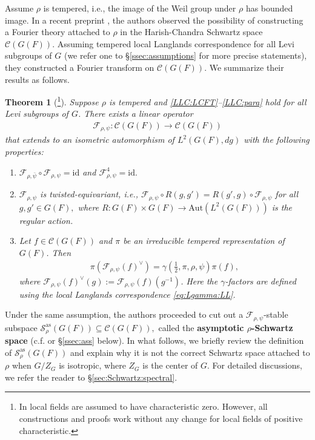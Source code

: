 \documentclass[10pt]{amsart}
\newtheorem{theorem}{Theorem}[section]
\theoremstyle{definition}
\numberwithin{equation}{section}
\numberwithin{equation}{subsection}
\begin{document}
Assume $\rho$ is tempered, i.e., the image of the Weil group under $\rho$ has bounded image. In a recent preprint \cite{DRS}, the authors observed the possibility of constructing a Fourier theory attached to $\rho$ in the Harish-Chandra Schwartz space $\mathcal{C}(G(F))$. Assuming tempered local Langlands correspondence for all Levi subgroups of $G$ (we refer one to \S\ref{ssec:assumptions} for more precise statements), they constructed a Fourier transform on $\mathcal{C}(G(F)).$ We summarize their results as follows.
\begin{theorem}[{\cite{DRS}}\footnote{ In \cite{DRS} local fields are assumed to have characteristic zero. However, all constructions and proofs work without any change for local fields of positive characteristic. }]
    Suppose $\rho$ is tempered and \eqref{LLC:LCFT}--\eqref{LLC:para} hold for all Levi subgroups of $G$. There exists a linear operator 
    \begin{align*}
        \mathcal{F}_{\rho,\psi}:\mathcal{C}(G(F))\to \mathcal{C}(G(F))
    \end{align*}
    that extends to an isometric automorphism of $L^2(G(F),dg)$ with the following properties:
    \begin{enumerate}
        \item $\mathcal{F}_{\rho,\bar{\psi}}\circ \mathcal{F}_{\rho,\psi}=\mathrm{id}$ and $\mathcal{F}_{\rho,\psi}^4=\mathrm{id}.$
        \item $\mathcal{F}_{\rho,\psi}$ is twisted-equivariant, i.e., $\mathcal{F}_{\rho,\psi}\circ R(g,g') = R(g',g)\circ \mathcal{F}_{\rho,\psi}$ for all $g,g'\in G(F),$ where $R:G(F)\times G(F)\longrightarrow\mathrm{Aut}(L^2(G(F)))$ is the regular action.
        \item Let $f\in \mathcal{C}(G(F))$ and $\pi$ be an irreducible tempered representation of $G(F)$. Then
        \begin{align*}
            \pi(\mathcal{F}_{\rho,\psi}(f)^\lor)=\gamma(\tfrac{1}{2},\pi,\rho,\psi)\pi(f),
        \end{align*}
        where $\mathcal{F}_{\rho,\psi}(f)^\lor(g):=\mathcal{F}_{\rho,\psi}(f)(g^{-1})$. Here the $\gamma$-factors are defined using the local Langlands correspondence \eqref{eq:Lgamma:LL}.
    \end{enumerate}
\end{theorem}

Under the same assumption, the authors proceeded to cut out a $\mathcal{F}_{\rho,\psi}$-stable subspace $\mathcal{S}^{\mathrm{as}}_\rho(G(F))\subseteq \mathcal{C}(G(F)),$ called the \textbf{asymptotic $\rho$-Schwartz space} (c.f.  \cite[\S 5]{DRS} or \S \ref{ssec:ass} below). In what follows, we briefly review the definition of $\mathcal{S}^{\mathrm{as}}_\rho(G(F))$ and explain why it is not the correct Schwartz space attached to $\rho$ when $G/Z_G$ is isotropic, where $Z_G$ is the center of $G$. For detailed discussions, we refer the reader to \S \ref{sec:Schwartz:spectral}.
\end{document}
